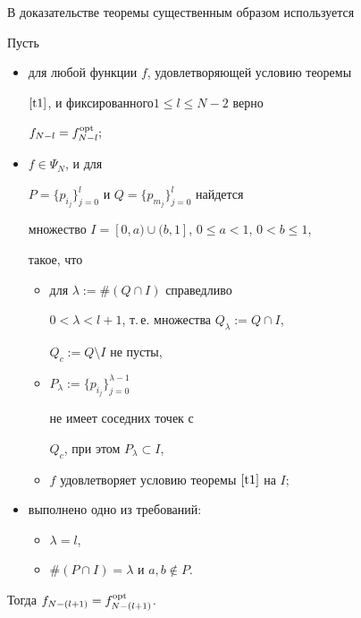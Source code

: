В доказательстве теоремы существенным образом используется





\begin{lem} Пусть


\begin{itemize}


\item[1)] для любой функции $f$, удовлетворяющей условию теоремы


$\ref{t1}$, и фиксированного\linebreak $1\leq l\leq N-2$ верно 


$f_{N-l}=f_{N-l}^{\operatorname{opt}};$


\item[2)] $f\in \Psi_N$, и для


$P=\{p_{i_j}\}_{j=0}^{l}$ и $Q=\{p_{m_j}\}_{j=0}^{l}$ найдется


множество $I=[0,a)\cup (b,1]$, $0\leq a<1$, $0< b \leq 1$,


такое, что


\begin{itemize}


\item[(a)] для $\lambda:=\#(Q \cap I)$ справедливо 


$0<\lambda <l+1$, т.\,е. множества $Q_{ \lambda}:=Q \cap I$,


$Q_c:=Q \setminus I$ не пусты,


\item[(b)] $P_{\lambda}:=\{p_{i_j}\}_{j=0}^{\lambda-1}$


не имеет соседних точек с


$Q_c$, при этом $P_{\lambda} \subset I$,


\item[(с)] $f$ удовлетворяет условию теоремы $\ref{t1}$ на $I;$


\end{itemize}


\item[3)] выполнено одно из требований\/${:}$


\begin{itemize}


\item[(a)] $\lambda=l$,


\item[(b)] $\#(P\cap I)=\lambda$ и $a,b \notin P$.


\end{itemize}


\end{itemize}


Тогда $f_{N-(l+1)}=f_{N-(l+1)}^{\operatorname{opt}}$. \label{ind}


\end{lem}





